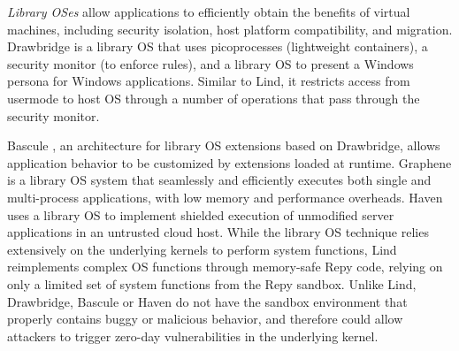 \textit{Library OSes}
allow applications to efficiently
obtain the benefits of virtual machines,
including security isolation, host platform compatibility, and
migration. 
%
Drawbridge \cite{Drawbridge-11} is a library OS that uses picoprocesses
(lightweight containers), a security monitor (to enforce rules),
and a library OS to present a Windows persona for %
Windows applications. Similar to Lind,
it restricts access from usermode to host OS through a number
of operations that pass through the security monitor.


Bascule \cite{Bascule}, an architecture for library OS extensions
based on Drawbridge, allows application behavior to be customized by
extensions loaded at runtime.
Graphene \cite{Graphene-14} is a library OS system that
seamlessly and efficiently executes both single and
multi-process applications, with low memory and performance overheads.
Haven \cite{Haven} uses a library OS to implement
shielded execution of unmodified server applications
in an untrusted cloud host.
While the library OS technique relies extensively on
the underlying kernels to perform system functions, 
Lind reimplements complex OS functions through memory-safe Repy 
code, relying on only a limited set of system functions from the Repy 
sandbox. Unlike Lind, Drawbridge, Bascule 
or Haven do not have the sandbox environment that properly contains 
buggy or malicious behavior, and therefore could allow attackers 
to trigger zero-day vulnerabilities in the underlying kernel. 


